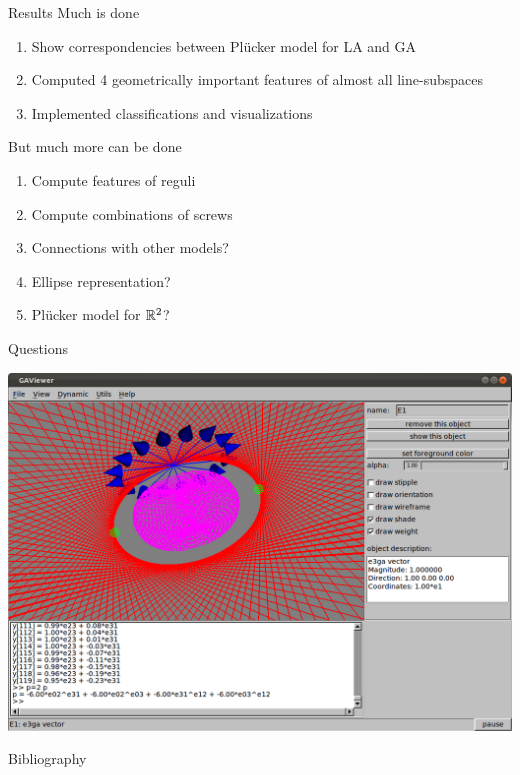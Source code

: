 \documentclass{beamer}
\begin{document}
\begin{frame}{Results}
  Much is done
  \begin{enumerate}
    \item Show correspondencies between Pl\"ucker model for LA and GA
    \item Computed 4 geometrically important features of almost all line-subspaces
    \item Implemented classifications and visualizations
  \end{enumerate}
  But much more can be done
  \begin{enumerate}
    \item Compute features of reguli
    \item Compute combinations of screws
    \item Connections with other models?
    \item Ellipse representation?
    \item Pl\"ucker model for $\mathbb{R}^2$?
  \end{enumerate}
\end{frame}

\begin{frame}{Questions}
  \begin{center}
    \includegraphics[width=1\textwidth]{gaviewer3}
  \end{center}
\end{frame}

\begin{frame}{Bibliography}
  
  
\end{frame}
\end{document}

